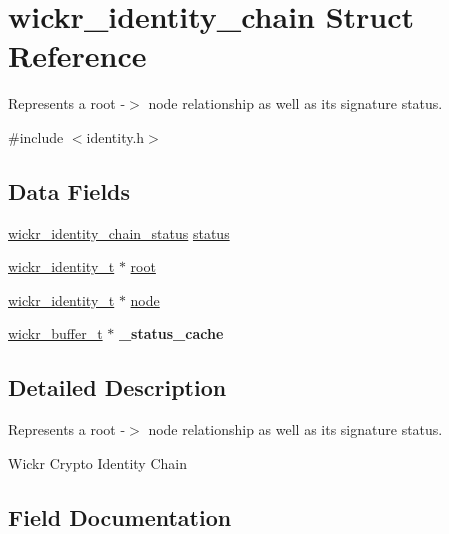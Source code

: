 \hypertarget{structwickr__identity__chain}{}\section{wickr\+\_\+identity\+\_\+chain Struct Reference}
\label{structwickr__identity__chain}


Represents a root -\/$>$ node relationship as well as it\textquotesingle{}s signature status.  




{\ttfamily \#include $<$identity.\+h$>$}

\subsection*{Data Fields}
\begin{DoxyCompactItemize}
\item 
\mbox{\hyperlink{group__wickr__identity_ga78aefa3835eb13ca75c0129583b5ebfa}{wickr\+\_\+identity\+\_\+chain\+\_\+status}} \mbox{\hyperlink{structwickr__identity__chain_acee365b411eb4a7e7c68c115d60e166e}{status}}
\item 
\mbox{\hyperlink{structwickr__identity}{wickr\+\_\+identity\+\_\+t}} $\ast$ \mbox{\hyperlink{structwickr__identity__chain_a0982b1510591138e2e7d0546741bc6e0}{root}}
\item 
\mbox{\hyperlink{structwickr__identity}{wickr\+\_\+identity\+\_\+t}} $\ast$ \mbox{\hyperlink{structwickr__identity__chain_a4343dae5f1c82057289c26e5c7bb1226}{node}}
\item 
\mbox{\label{structwickr__identity__chain_a231dbd6f386be77d7bf011ddfe1a168d}} 
\mbox{\hyperlink{structwickr__buffer}{wickr\+\_\+buffer\+\_\+t}} $\ast$ {\bfseries \+\_\+status\+\_\+cache}
\end{DoxyCompactItemize}


\subsection{Detailed Description}
Represents a root -\/$>$ node relationship as well as it\textquotesingle{}s signature status. 

Wickr Crypto Identity Chain 

\subsection{Field Documentation}
\mbox{\label{structwickr__identity__chain_a4343dae5f1c82057289c26e5c7bb1226}} 
